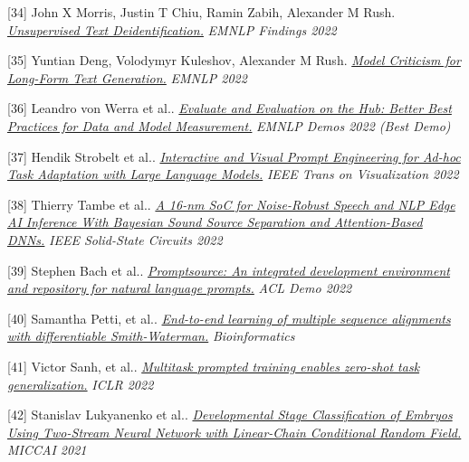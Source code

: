 \documentclass[10pt]{article}
\begin{document}
\medskip


[34] \ind John X Morris, Justin T Chiu, Ramin Zabih, Alexander M Rush. \emph{\href{ https://arxiv.org/pdf/2210.11528.pdf }{ Unsupervised Text Deidentification.} }\emph{ EMNLP Findings 2022 }

\medskip


[35] \ind Yuntian Deng, Volodymyr Kuleshov, Alexander M Rush. \emph{\href{ https://arxiv.org/pdf/2210.08444.pdf }{ Model Criticism for Long-Form Text Generation.} }\emph{ EMNLP 2022 }

\medskip


[36] \ind Leandro von Werra et al.. \emph{\href{ https://arxiv.org/abs/2210.01970 }{ Evaluate and Evaluation on the Hub: Better Best Practices for Data and Model Measurement.} }\emph{ EMNLP Demos 2022 (Best Demo) }

\medskip


[37] \ind Hendik Strobelt et al.. \emph{\href{ https://ieeexplore.ieee.org/abstract/document/9908590 }{ Interactive and Visual Prompt Engineering for Ad-hoc Task Adaptation with Large Language Models.} }\emph{ IEEE Trans on Visualization 2022 }

\medskip


[38] \ind Thierry Tambe et al.. \emph{\href{ https://discovery.ucl.ac.uk/id/eprint/10150658/1/A_16-nm_SoC_for_Noise-Robust_Speech.pdf }{ A 16-nm SoC for Noise-Robust Speech and NLP Edge AI Inference With Bayesian Sound Source Separation and Attention-Based DNNs.} }\emph{ IEEE Solid-State Circuits 2022 }

\medskip


[39] \ind Stephen Bach et al.. \emph{\href{ https://arxiv.org/abs/2202.01279 }{ Promptsource: An integrated development environment and repository for natural language prompts.} }\emph{ ACL Demo 2022 }

\medskip


[40] \ind Samantha Petti, et al.. \emph{\href{ http://repository.cshl.edu/id/eprint/40409/1/2021.Petti.multiple_sequence_alignments.pdf }{ End-to-end learning of multiple sequence alignments with differentiable Smith-Waterman.} }\emph{ Bioinformatics }

\medskip


[41] \ind Victor Sanh, et al.. \emph{\href{ https://arxiv.org/pdf/2110.08207 }{ Multitask prompted training enables zero-shot task generalization.} }\emph{ ICLR 2022 }

\medskip


[42] \ind Stanislav Lukyanenko et al.. \emph{\href{ https://www.ncbi.nlm.nih.gov/pmc/articles/PMC8526069/ }{ Developmental Stage Classification of Embryos Using Two-Stream Neural Network with Linear-Chain Conditional Random Field.} }\emph{ MICCAI 2021 }
\end{document}

